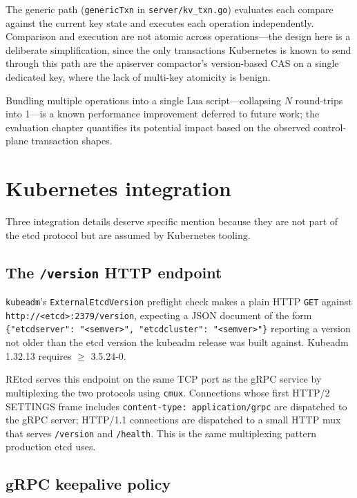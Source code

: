 The generic path (\texttt{genericTxn} in \texttt{server/kv\_txn.go}) evaluates each compare against the current key state and executes each operation independently. Comparison and execution are not atomic across operations---the design here is a deliberate simplification, since the only transactions Kubernetes is known to send through this path are the apiserver compactor's version-based CAS on a single dedicated key, where the lack of multi-key atomicity is benign.

Bundling multiple operations into a single Lua script---collapsing $N$ round-trips into 1---is a known performance improvement deferred to future work; the evaluation chapter quantifies its potential impact based on the observed control-plane transaction shapes.

\section{Kubernetes integration}
\label{sec:design-k8s}

Three integration details deserve specific mention because they are not part of the etcd protocol but are assumed by Kubernetes tooling.

\subsection{The \texttt{/version} HTTP endpoint}
\label{sec:design-k8s-version}

\texttt{kubeadm}'s \texttt{ExternalEtcdVersion} preflight check makes a plain HTTP \texttt{GET} against \texttt{http://<etcd>:2379/version}, expecting a JSON document of the form \texttt{\{"etcdserver": "<semver>", "etcdcluster": "<semver>"\}} reporting a version not older than the etcd version the kubeadm release was built against. Kubeadm 1.32.13 requires $\geq$ 3.5.24-0.

REtcd serves this endpoint on the same TCP port as the gRPC service by multiplexing the two protocols using \texttt{cmux}. Connections whose first HTTP/2 SETTINGS frame includes \texttt{content-type: application/grpc} are dispatched to the gRPC server; HTTP/1.1 connections are dispatched to a small HTTP mux that serves \texttt{/version} and \texttt{/health}. This is the same multiplexing pattern production etcd uses.

\subsection{gRPC keepalive policy}
\label{sec:design-k8s-keepalive}

